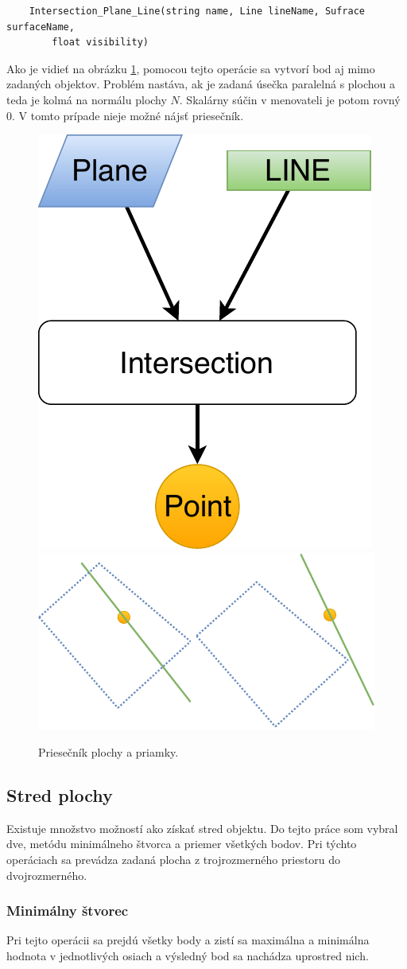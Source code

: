 \begin{lstlisting}
	Intersection_Plane_Line(string name, Line lineName, Sufrace surfaceName,
	    float visibility)
\end{lstlisting}

Ako je vidieť na obrázku \ref{fig:GraphIntersection_Plane_Line}, pomocou tejto operácie sa vytvorí bod aj mimo zadaných objektov. Problém nastáva, ak je zadaná úsečka paralelná s plochou a teda je kolmá na normálu plochy $N$. Skalárny súčin v menovateli je potom rovný 0. V tomto prípade nieje možné nájsť priesečník.

\begin{figure}[H]
	\centering
	\includegraphics[height=0.3\textwidth]{obrazky-figures/Diagram/Point/DP Navrh operacii-0D - PointIntersection PlaneLine.pdf}
	\includegraphics[height=0.3\textwidth]{obrazky-figures/Diagram/Draw/1Points/DP Navrh operacii-0D - PointIntersectionPlaneLine.pdf}
	\caption{Priesečník plochy a priamky.}
	\label{fig:GraphIntersection_Plane_Line}
\end{figure}

\subsection{Stred plochy}
Existuje množstvo možností ako získať stred objektu. Do tejto práce som vybral dve, metódu minimálneho štvorca a priemer všetkých bodov. Pri týchto operáciach sa prevádza 
zadaná plocha z trojrozmerného priestoru  do dvojrozmerného.


\subsubsection{Minimálny štvorec}
Pri tejto operácii sa prejdú všetky body a zistí sa maximálna a minimálna hodnota v jednotlivých osiach a výsledný bod sa nachádza uprostred nich.


